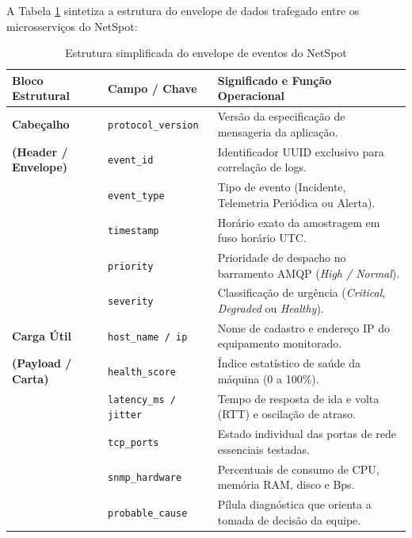 \documentclass[12pt,a4paper]{article}
\newcommand{\fonte}[1]{\par\vspace{-0.5em}{\small Fonte: #1}\par}
\begin{document}
A Tabela \ref{tab:envelope_protocolo} sintetiza a estrutura do envelope de dados trafegado entre os microsserviços do NetSpot:

\begin{table}[H]
\centering
\caption{Estrutura simplificada do envelope de eventos do NetSpot}
\label{tab:envelope_protocolo}
\small
\begin{tabular}{@{}p{3.0cm}p{3.5cm}p{7.5cm}@{}}
\toprule
\textbf{Bloco Estrutural} & \textbf{Campo / Chave} & \textbf{Significado e Função Operacional} \\
\midrule
\textbf{Cabeçalho} & \texttt{protocol\_version} & Versão da especificação de mensageria da aplicação. \\
\textbf{(Header / Envelope)} & \texttt{event\_id} & Identificador UUID exclusivo para correlação de logs. \\
& \texttt{event\_type} & Tipo de evento (Incidente, Telemetria Periódica ou Alerta). \\
& \texttt{timestamp} & Horário exato da amostragem em fuso horário UTC. \\
& \texttt{priority} & Prioridade de despacho no barramento AMQP (\textit{High / Normal}). \\
& \texttt{severity} & Classificação de urgência (\textit{Critical}, \textit{Degraded} ou \textit{Healthy}). \\
\midrule
\textbf{Carga Útil} & \texttt{host\_name / ip} & Nome de cadastro e endereço IP do equipamento monitorado. \\
\textbf{(Payload / Carta)} & \texttt{health\_score} & Índice estatístico de saúde da máquina (0 a 100\%). \\
& \texttt{latency\_ms / jitter} & Tempo de resposta de ida e volta (RTT) e oscilação de atraso. \\
& \texttt{tcp\_ports} & Estado individual das portas de rede essenciais testadas. \\
& \texttt{snmp\_hardware} & Percentuais de consumo de CPU, memória RAM, disco e Bps. \\
& \texttt{probable\_cause} & Pílula diagnóstica que orienta a tomada de decisão da equipe. \\
\bottomrule
\end{tabular}
\fonte{Autoria própria (2026).}
\end{table}
\end{document}
